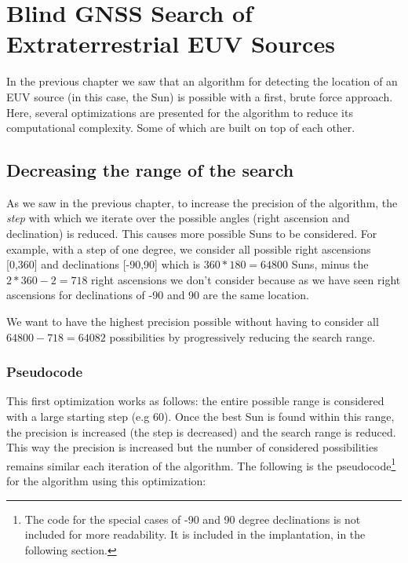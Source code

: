 \chapter{Blind GNSS Search of Extraterrestrial EUV Sources}

In the previous chapter we saw that an algorithm for detecting the location of an EUV source (in this case, the Sun) is possible with a first, brute force approach. Here, several optimizations are presented for the algorithm to reduce its computational complexity. Some of which are built on top of each other.

\section{Decreasing the range of the search}

As we saw in the previous chapter, to increase the precision of the algorithm, the \textit{step} with which we iterate over the possible angles (right ascension and declination) is reduced. This causes more possible Suns to be considered. For example, with a step of one degree, we consider all possible right ascensions [0,360] and declinations [-90,90] which is  $360*180 = 64800$ Suns, minus the $2*360 - 2 = 718$ right ascensions we don't consider because as we have seen right ascensions for declinations of -90 and 90 are the same location.

We want to have the highest precision possible without having to consider all $64800 - 718 = 64082$ possibilities by progressively reducing the search range. 

\subsection{Pseudocode}

This first optimization works as follows: the entire possible range is considered with a large starting step (e.g 60). Once the best Sun is found within this range, the precision is increased (the step is decreased) and the search range is reduced. This way the precision is increased but the number of considered possibilities remains similar each iteration of the algorithm. The following is the pseudocode\footnote{The code for the special cases of -90 and 90 degree declinations is not included for more readability. It is included in the implantation, in the following section.} for the algorithm using this optimization:

